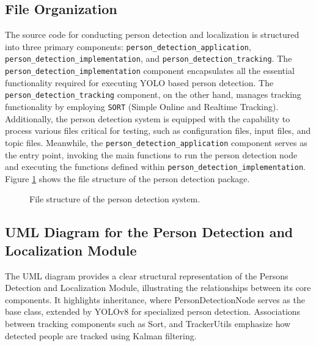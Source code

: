 \documentclass{CSSRforAfrica}
\begin{document}
\subsection*{File Organization}
The source code for conducting person detection and localization is structured into three primary components: \texttt{person\_detection\_application}, \texttt{person\_detection\_implementation}, and \texttt{person\_detection\_tracking}. The \texttt{person\_detection\_implementation} component encapsulates all the essential functionality required for executing YOLO based person detection. The \texttt{person\_detection\_tracking} component, on the other hand, manages tracking functionality by employing \texttt{SORT} (Simple Online and Realtime Tracking). Additionally, the person detection system is equipped with the capability to process various files critical for testing, such as configuration files, input files, and topic files. Meanwhile, the \texttt{person\_detection\_application} component serves as the entry point, invoking the main functions to run the person detection node and executing the functions defined within \texttt{person\_detection\_implementation}.\\

Figure \ref{fig:person_detection_directory} shows the file structure of the person detection package.

\begin{figure}[h]	
	\renewcommand*\DTstyle{\ttfamily}
	\caption{File structure of the person detection system.}
	\label{fig:person_detection_directory}
\end{figure}

\subsection*{UML Diagram for the Person Detection and Localization Module}
The UML diagram provides a clear structural representation of the Persons Detection and Localization Module, illustrating the relationships between its core components. It highlights inheritance, where PersonDetectionNode serves as the base class, extended by YOLOv8 for specialized person detection. Associations between tracking components such as Sort, and TrackerUtils emphasize how detected people are tracked using Kalman filtering. 
\end{document}
